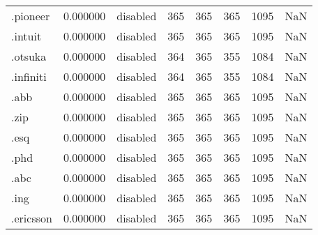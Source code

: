 \begin{tabular}{lrlrrrrl}
.pioneer                  &          0.000000 &        disabled &                         365 &                         365 &                         365 &                1095 &                  NaN \\
.intuit                   &          0.000000 &        disabled &                         365 &                         365 &                         365 &                1095 &                  NaN \\
.otsuka                   &          0.000000 &        disabled &                         364 &                         365 &                         355 &                1084 &                  NaN \\
.infiniti                 &          0.000000 &        disabled &                         364 &                         365 &                         355 &                1084 &                  NaN \\
.abb                      &          0.000000 &        disabled &                         365 &                         365 &                         365 &                1095 &                  NaN \\
.zip                      &          0.000000 &        disabled &                         365 &                         365 &                         365 &                1095 &                  NaN \\
.esq                      &          0.000000 &        disabled &                         365 &                         365 &                         365 &                1095 &                  NaN \\
.phd                      &          0.000000 &        disabled &                         365 &                         365 &                         365 &                1095 &                  NaN \\
.abc                      &          0.000000 &        disabled &                         365 &                         365 &                         365 &                1095 &                  NaN \\
.ing                      &          0.000000 &        disabled &                         365 &                         365 &                         365 &                1095 &                  NaN \\
.ericsson                 &          0.000000 &        disabled &                         365 &                         365 &                         365 &                1095 &                  NaN \\

\end{tabular}
